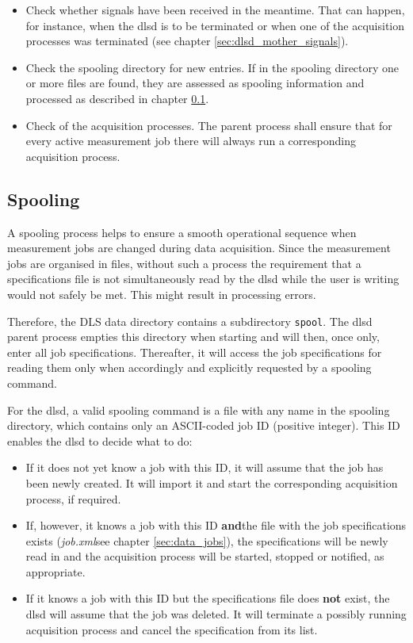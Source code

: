 \documentclass[a4paper,12pt,BCOR6mm,bibtotoc,idxtotoc]{scrbook}
\begin{document}
\begin{itemize} 
\item Check whether signals have been received in the meantime. That can happen, for instance, when the dlsd is to be terminated or when one of the acquisition processes was terminated (see chapter \ref{sec:dlsd_mother_signals}). 
\item Check the spooling directory for new entries. If in the spooling directory one or more files are found, they are assessed as spooling information and processed as described in chapter \ref{sec:dlsd_mother_spooling}. 
\item Check of the acquisition processes. The parent process shall ensure that for every active measurement job there will always run a corresponding acquisition process. \end{itemize}


\subsection{Spooling} \label{sec:dlsd_mother_spooling} 

A spooling process helps to ensure a smooth operational sequence when measurement jobs  are changed during data acquisition. Since the measurement jobs are organised in files, without such a process the requirement that a specifications file is not simultaneously read by the dlsd while the user is writing would not safely be met. This might result in processing errors.

Therefore, the DLS data directory contains a subdirectory \texttt{spool}. The dlsd parent process empties this directory when starting and will then, once only, enter all job specifications. Thereafter, it will access the job specifications for reading them only when accordingly and explicitly requested by a spooling command.

For the dlsd, a valid spooling command is a file with any name in the spooling directory, which contains only an ASCII-coded job ID (positive integer). This ID enables the dlsd to decide what to do:

\begin{itemize} 
\item If it does not yet know a job with this ID, it will assume that the job has been newly created. It will import it and start the corresponding acquisition process, if required. 
\item If, however, it knows a job with this ID \textbf{and}the file with the job specifications exists (\textit{job.xml}see chapter \ref{sec:data_jobs}), the specifications will be newly read in and the acquisition process will be started, stopped or notified, as appropriate. 
\item If it knows a job with this ID but the specifications file does \textbf{not} exist, the dlsd will assume that the job was deleted. It will terminate a possibly running acquisition process and cancel the specification from its list. \end{itemize}
\end{document}
